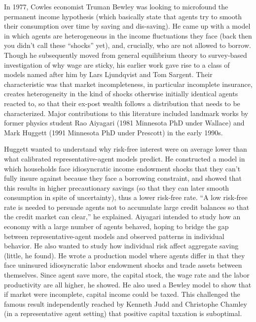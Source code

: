 \documentclass[cn,10pt,math=newtx,citestyle=gb7714-2015,bibstyle=gb7714-2015]{elegantbook}
\begin{document}
	In 1977, Cowles economist Truman Bewley was looking to microfound the permanent income hypothesis (which basically state that agents try to smooth their consumption over time by saving and dis-saving). He came up with a model in which agents are heterogeneous in the income fluctuations they face (back then you didn’t call these “shocks” yet), and, crucially, who are not allowed to borrow. Though he subsequently moved from general equilibrium theory to survey-based investigation of why wage are sticky, his earlier work gave rise to a class of models named after him by Lars Ljundqvist and Tom Sargent. Their characteristic was that market incompleteness, in particular incomplete insurance, creates heterogeneity in the kind of shocks otherwise initially identical agents reacted to, so that their ex-post wealth follows a distribution that needs to be characterized. Major contributions to this literature included landmark works by former physics student Rao Aiyagari (1981 Minnesota PhD under Wallace) and Mark Huggett (1991 Minnesota PhD under Prescott) in the early 1990s.
	
	Huggett wanted to understand why risk-free interest were on average lower than what calibrated representative-agent models predict. He constructed a model in which households face idiosyncratic income endowment shocks that they can’t fully insure against because they face a borrowing constraint, and showed that this results in higher precautionary savings (so that they can later smooth consumption in spite of uncertainty), thus a lower risk-free rate. “A low risk-free rate is needed to persuade agents not to accumulate large credit balances so that the credit market can clear,” he explained. Aiyagari intended to study how an economy with a large number of agents behaved, hoping to bridge the gap between representative-agent models and observed patterns in individual behavior. He also wanted to study how individual risk affect aggregate saving (little, he found). He wrote a production model where agents differ in that they face uninsured idiosyncratic labor endowment shocks and trade assets between themselves. Since agent save more, the capital stock, the wage rate and the labor productivity are all higher, he showed.  He also used a Bewley model to show that if market were incomplete, capital income could be taxed. This challenged the famous result independently reached by Kenneth Judd and Christophe Chamley (in a representative agent setting) that positive capital taxation is suboptimal.
	
\end{document}
